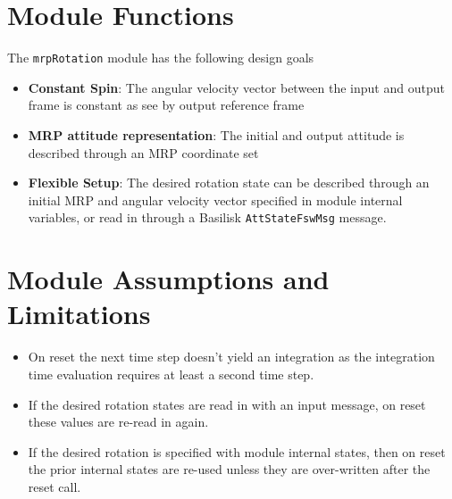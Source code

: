 

\section{Module Functions}
The {\tt mrpRotation} module has the following design goals
\begin{itemize}
	\item \textbf{Constant Spin}: The angular velocity vector between the input and output frame is constant as see by output reference frame
	\item \textbf{MRP attitude representation}: The initial and output attitude is described through an MRP coordinate set
	\item \textbf{Flexible Setup}:  The desired rotation state can be described through an initial MRP and angular velocity vector specified in module internal variables, or read in through a Basilisk {\tt AttStateFswMsg} message.
\end{itemize}

\section{Module Assumptions and Limitations}
\begin{itemize}
	\item On reset the  next time step doesn't yield an integration as the integration time evaluation requires at least a second time step.
	\item If the desired rotation states are read in with an input message, on reset these values are re-read in again.
	\item If the desired rotation is specified with module internal states, then on reset the prior internal states are re-used unless they are over-written after the reset call.
\end{itemize}